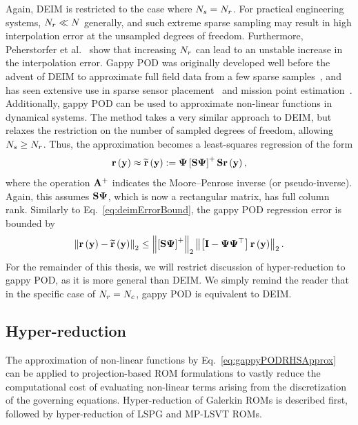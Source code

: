 Again, DEIM is restricted to the case where $N_s = N_r$. For practical engineering systems, $N_r \ll N$ generally, and such extreme sparse sampling may result in high interpolation error at the unsampled degrees of freedom. Furthermore, Peherstorfer et al.~\cite{Peherstorfer2020} show that increasing $N_r$ can lead to an unstable increase in the interpolation error. Gappy POD was originally developed well before the advent of DEIM to approximate full field data from a few sparse samples~\cite{Everson1995}, and has seen extensive use in sparse sensor placement~\cite{willcoxGappyPOD,ManoharSparseSensor} and mission point estimation~\cite{BuiThanh2004,Astrid2008,Zimmermann2016}. Additionally, gappy POD can be used to approximate non-linear functions in dynamical systems. The method takes a very similar approach to DEIM, but relaxes the restriction on the number of sampled degrees of freedom, allowing $N_s \ge N_r$. Thus, the approximation becomes a least-squares regression of the form
%
\begin{equation}\label{eq:gappyPODRHSApprox}
    \resFunc{\dummyVec} \approx \resApproxFunc{\dummyVec} \defEq \deimBasis \left[ \sampMat \deimBasis \right]^{+} \sampMat \resFunc{\dummyVec},
\end{equation}
%
where the operation $\mathbf{A}^+$ indicates the Moore--Penrose inverse (or pseudo-inverse). Again, this assumes $\sampMat \deimBasis$, which is now a rectangular matrix, has full column rank. Similarly to Eq.~\ref{eq:deimErrorBound}, the gappy POD regression error is bounded by
%
\begin{equation}\label{eq:gappyPODErrorBound}
    \left\Vert \resFunc{\dummyVec} - \resApproxFunc{\dummyVec} \right\Vert_2 \le \left\Vert \left[ \sampMat \deimBasis \right]^{+} \right\Vert_2 \left\Vert \left[ \identMat - \deimBasis \deimBasis^\top \right] \resFunc{\dummyVec} \right\Vert_2.
\end{equation}
%
For the remainder of this thesis, we will restrict discussion of hyper-reduction to gappy POD, as it is more general than DEIM. We simply remind the reader that in the specific case of $N_r = N_c$, gappy POD is equivalent to DEIM.

\subsection{Hyper-reduction}
%
The approximation of non-linear functions by Eq.~\ref{eq:gappyPODRHSApprox} can be applied to projection-based ROM formulations to vastly reduce the computational cost of evaluating non-linear terms arising from the discretization of the governing equations. Hyper-reduction of Galerkin ROMs is described first, followed by hyper-reduction of LSPG and MP-LSVT ROMs.

